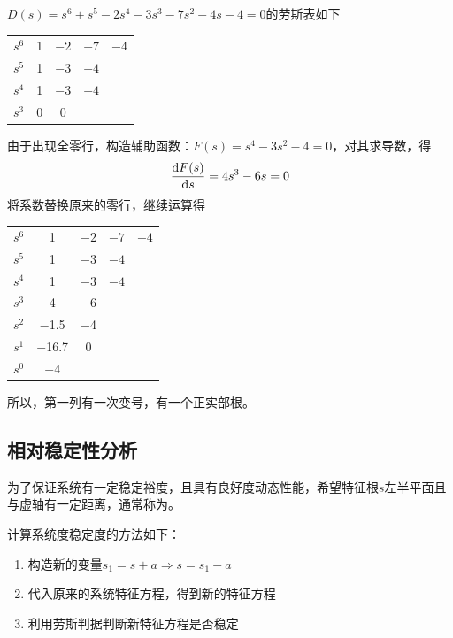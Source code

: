 \begin{itemize}
\examples $D(s) = s^6 + s^5 -2s^4 -3s^3 - 7s^2 -4s -4 = 0$的劳斯表如下
\begin{center}
	\begin{tabular}{ccccc}
		$s^6$ & 1 & $-2$ & $-7$ & $-4$ \\
		$s^5$ & 1 &$-3$ & $-4$ & \\
		$s^4$ & 1 &$-3$ & $-4$ & \\
		$s^3$ & 0 & 0 &  &\\
	\end{tabular}
\end{center}
由于出现全零行，构造辅助函数：$F(s) = s^4 - 3s^2 -4 = 0$，对其求导数，得
\[
\dfrac{{\rm{d}} F(s)}{{\rm{d}} s} = 4s^3 - 6s = 0
\]
将系数替换原来的零行，继续运算得
\begin{center}
	\begin{tabular}{ccccc}
		$s^6$ & 1 & $-2$ & $-7$ & $-4$ \\
		$s^5$ & 1 &$-3$ & $-4$ & \\
		$s^4$ & 1 &$-3$ & $-4$ & \\
		$s^3$ & 4& $-6$ &  &\\
		$s^2$ & $-$1.5 & $-$4 &  &\\
		$s^1$ & $-$16.7 & 0 &&\\
		$s^0$ & $-$4 &&&\\ 
	\end{tabular}
\end{center}
所以，第一列有一次变号，有一个正实部根。
\end{itemize}


\subsection{相对稳定性分析}
\tdefination[稳定度]
为了保证系统有一定稳定裕度，且具有良好度动态性能，希望特征根$s$左半平面且与虚轴有一定距离，通常称为。\vspace*{1em}

\noindent 计算系统度稳定度的方法如下：
\begin{enumerate}
	\item 构造新的变量$s_1 = s + a \Rightarrow s = s_1 - a$
	\item 代入原来的系统特征方程，得到新的特征方程
	\item 利用劳斯判据判断新特征方程是否稳定
\end{enumerate}

